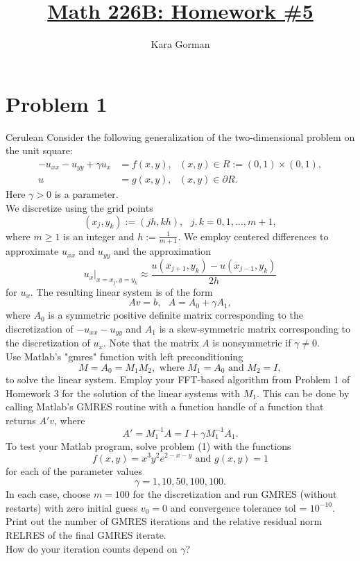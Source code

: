 \documentclass[12pt]{article}
\title{\underline{Math 226B: Homework \#5}}
\author{\huge Kara Gorman}
\begin{document}
\maketitle
\bigskip\bigskip\bigskip\bigskip\bigskip\bigskip\bigskip\bigskip\bigskip\bigskip

\tableofcontents
\newpage


\section{Problem 1} \begin{mybox}{Cerulean}{}
Consider the following generalization of the two-dimensional problem on the unit square:
\begin{align}
-u_{xx} - u_{yy} + \gamma u_x &= f(x,y), \text{ } (x,y) \in R:=(0,1)\times (0,1),  \\
u &= g(x,y), \text{ } (x,y) \in \partial R.\nonumber
\end{align}
Here $\gamma >0$ is a parameter.\\
We discretize using the grid points
$$(x_j,y_k):=(jh,kh), \text{ } j,k=0,1,\dots,m+1,$$
where $m \geq 1$ is an integer and $h:=\frac{1}{m+1}$.  We employ centered differences to approximate $u_{xx}$ and $u_{yy}$ and the approximation
$$u_x \big\vert_{x=x_j, y=y_k} \approx \frac{u(x_{j+1},y_k) - u(x_{j-1},y_k)}{2h}$$
for $u_x$.  The resulting linear system is of the form
$$Av = b, \text{ } A = A_0 + \gamma A_1,$$
where $A_0$ is a symmetric positive definite matrix corresponding to the discretization of $-u_{xx} - u_{yy}$ and $A_1$ is a skew-symmetric matrix corresponding to the discretization of $u_x$.  Note that the matrix $A$ is nonsymmetric if $\gamma \neq 0$.\\
Use Matlab's "gmres" function with left preconditioning
$$M = A_0 = M_1 M_2, \text{ where } M_1=A_0 \text{ and } M_2=I,$$
to solve the linear system.  Employ your FFT-based algorithm from Problem 1 of Homework 3 for the solution of the linear systems with $M_1$.  This can be done by calling Matlab's GMRES routine with a function handle of a function that returns $A'v$, where
$$A' = M_1^{-1}A = I + \gamma M_1^{-1}A_1.$$
To test your Matlab program, solve problem (1) with the functions
$$f(x,y) = x^3y^2e^{2-x-y} \text{ and } g(x,y) = 1$$
for each of the parameter values
$$\gamma = 1, 10, 50, 100, 100.$$
In each case, choose $m=100$ for the discretization and run GMRES (without restarts) with zero initial guess $v_0 = 0$ and convergence tolerance tol = $10^{-10}$.\\
Print out the number of GMRES iterations and the relative residual norm RELRES of the final GMRES iterate.\\
How do your iteration counts depend on $\gamma$?
\end{mybox}
\end{document}
